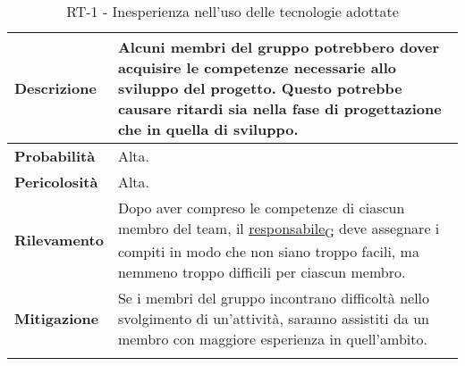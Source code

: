 \begin{longtable}{ | l | p{12cm} | }
	\hline
	\textbf{Descrizione}  & Alcuni membri del gruppo potrebbero dover acquisire le competenze necessarie allo sviluppo del progetto. Questo potrebbe causare ritardi sia nella fase di progettazione che in quella di sviluppo. \\
	\hline
	\textbf{Probabilità}  & Alta.                                                                                                                                                                                               \\
	\hline
	\textbf{Pericolosità} & Alta.                                                                                                                                                                                               \\
	\hline
	\textbf{Rilevamento}  & Dopo aver compreso le competenze di ciascun membro del team, il \href{https://7last.github.io/docs/rtb/documentazione-interna/glossario\#responsabile}{responsabile\textsubscript{G}} deve assegnare i compiti in modo che non siano troppo facili, ma nemmeno troppo difficili per ciascun membro.          \\
	\hline
	\textbf{Mitigazione}  & Se i membri del gruppo incontrano difficoltà nello svolgimento di un'attività, saranno assistiti da un membro con maggiore esperienza in quell'ambito.                                              \\
	\hline
	\caption{RT-1 - Inesperienza nell'uso delle tecnologie adottate}
\end{longtable}

\newpage


